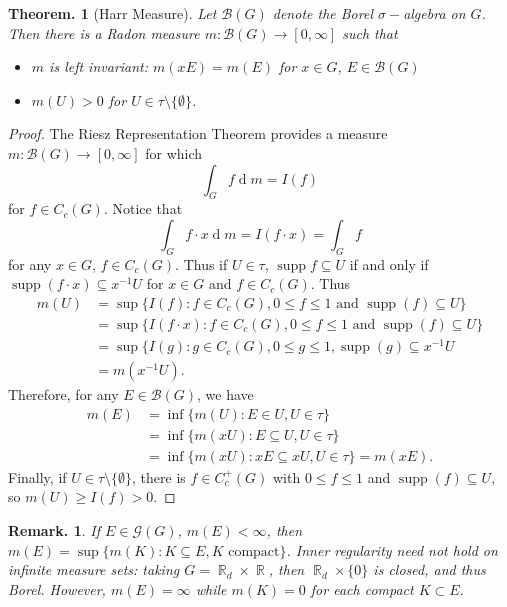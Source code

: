 \documentclass[11pt, a4paper]{memoir}
\DeclareMathOperator{\R}{{\mathbb{R}}}
\theoremstyle{change}
\newtheorem{theorem}{Theorem.}[section]
\theoremstyle{plain}
\theoremstyle{nonumberplain}
\newtheorem{remark}{Remark.}
\newtheorem{proof}{Proof}
\DeclareMathOperator{\supp}{supp}
\renewcommand{\d}[1]{\ensuremath{\operatorname{d}\!{#1}}}
\numberwithin{equation}{section}
\begin{document}
\begin{theorem}[Harr Measure]
    Let $\mathcal{B}(G)$ denote the Borel $\sigma-$algebra on $G$.
    Then there is a Radon measure $m:\mathcal{B}(G)\to[0,\infty]$ such that
    \begin{itemize}[nl]
        \item $m$ is left invariant: $m(xE)=m(E)$ for $x\in G$, $E\in\mathcal{B}(G)$
        \item $m(U)>0$ for $U\in\tau\setminus\{\emptyset\}$.
    \end{itemize}
\end{theorem}
\begin{proof}
    The Riesz Representation Theorem provides a measure $m:\mathcal{B}(G)\to[0,\infty]$ for which
    \begin{equation*}
        \int_G f \d{m}=I(f)
    \end{equation*}
    for $f\in C_c(G)$.
    Notice that
    \begin{equation*}
        \int_G f\cdot x\d{m}=I(f\cdot x)=\int_G f
    \end{equation*}
    for any $x\in G$, $f\in C_c(G)$.
    Thus if $U\in\tau$, $\supp f\subseteq U$ if and only if $\supp(f\cdot x)\subseteq x^{-1}U$ for $x\in G$ and $f\in C_c(G)$.
    Thus
    \begin{align*}
        m(U) &= \sup\{I(f):f\in C_c(G),0\leq f\leq 1\text{ and }\supp(f)\subseteq U\}\\
             &= \sup\{I(f\cdot x):f\in C_c(G),0\leq f\leq 1\text{ and }\supp(f)\subseteq U\}\\
             &= \sup\{I(g):g\in C_c(G),0\leq g\leq 1,\supp(g)\subseteq x^{-1}U\\
             &= m(x^{-1}U).
    \end{align*}
    Therefore, for any $E\in\mathcal{B}(G)$, we have
    \begin{align*}
        m(E)&=\inf\{m(U):E\in U,U\in\tau\}\\
            &=\inf\{m(xU):E\subseteq U,U\in\tau\}\\
            &=\inf\{m(xU):xE\subseteq xU,U\in\tau\}=m(xE).
    \end{align*}
    Finally, if $U\in\tau\setminus\{\emptyset\}$, there is $f\in C_c^+(G)$ with $0\leq f\leq 1$ and $\supp(f)\subseteq U$, so $m(U)\geq I(f)>0$.
\end{proof}
\begin{remark}
    If $E\in\mathcal{G}(G)$, $m(E)<\infty$, then $m(E)=\sup\{m(K):K\subseteq E,K\text{ compact}\}$.
    Inner regularity need not hold on infinite measure sets: taking $G=\R_d\times\R$, then $\R_d\times\{0\}$ is closed, and thus Borel.
    However, $m(E)=\infty$ while $m(K)=0$ for each compact $K\subset E$.
\end{remark}
\end{document}
